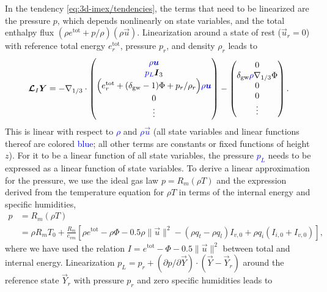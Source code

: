 \documentclass{report}
\numberwithin{equation}{section}
\begin{document}
In the tendency \eqref{eq:3d-imex/tendencies}, the terms that need to be linearized are the pressure $p$, which depends nonlinearly on state variables, and the total enthalpy flux $(\rho e^{\mathrm{tot}} + p/\rho) (\rho \vec{u})$. Linearization around a state of rest ($\vec{u}_r=0$) with reference total energy $e^{\mathrm{tot}}_r$, pressure $p_r$, and density $\rho_r$ leads to
 \begin{equation}\label{e:IMEX_linear}
 \vec{\mathcal{L}}_I \vec{Y} = 
 -\nabla_{1/3} \cdot \begin{pmatrix}
 \textcolor{blue}{\rho \vec{u}} \\
 \textcolor{blue}{p_L} \vec{I}_3  \\
 \Bigl(e^{\mathrm{tot}}_r  + (\delta_{\mathrm{gw}}-1)\Phi + p_r/\rho_r \Bigr) \textcolor{blue}{\rho \vec{u}}\\
 0\\
\vdots
\end{pmatrix}
-
\begin{pmatrix}
0 \\
\delta_{\mathrm{gw}} \textcolor{blue} \rho \nabla_{1/3} \Phi \\
0\\
0\\
\vdots
\end{pmatrix}.
\end{equation}
This is linear with respect to \textcolor{blue}{$\rho$} and \textcolor{blue}{$\rho \vec{u}$} (all state variables and linear functions thereof are colored \textcolor{blue}{blue}; all other terms are constants or fixed functions of height $z$). For it to be a linear function of all state variables, the pressure \textcolor{blue}{$p_L$} needs to be expressed as a linear function of state variables. To derive a linear approximation for the pressure, we use the ideal gas law $p = R_m (\rho T)$ and the expression derived from the temperature equation 
for $\rho T$ in terms of the internal energy and specific humidities,
\begin{equation}\label{e:pressure}
\begin{split}
p &= R_m (\rho T) \\
  &= \rho R_m T_0 + \frac{R_m}{c_{vm}} \left[\rho e^{\mathrm{tot}} - \rho \Phi - 0.5 \rho \|\vec{u}\|^2 - (\rho q_t - \rho q_l) I_{v,0} + \rho q_i (I_{i,0} + I_{v,0}) \right],
\end{split}
\end{equation}
where we have used the relation $I = e^{\mathrm{tot}} - \Phi - 0.5 \|\vec{u}\|^2$ between total and internal energy. Linearization $p_L = p_r + (\partial p/\partial\vec{Y})\cdot(\vec{Y}-\vec{Y}_r)$ around the reference state $\vec{Y}_r$ with pressure $p_r$ and zero specific humidities leads to 
\end{document}
